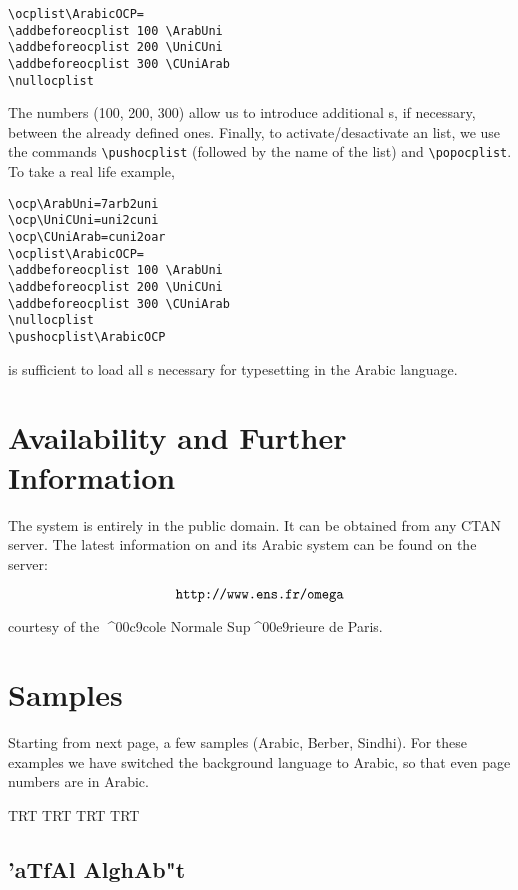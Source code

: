\documentclass[a4paper,11pt]{article}
\begin{document}
\begin{verbatim}
\ocplist\ArabicOCP=
\addbeforeocplist 100 \ArabUni
\addbeforeocplist 200 \UniCUni
\addbeforeocplist 300 \CUniArab
\nullocplist
\end{verbatim}

The numbers (100, 200, 300) allow us to introduce additional \OTP{}s,
if necessary, between the already defined ones.  Finally, to
activate/desactivate an \OTP{} list, we use the commands
\verb=\pushocplist= (followed by the name of the \OTP{} list) and
\verb=\popocplist=. To take a real life example,

\begin{verbatim}
\ocp\ArabUni=7arb2uni
\ocp\UniCUni=uni2cuni
\ocp\CUniArab=cuni2oar
\ocplist\ArabicOCP=
\addbeforeocplist 100 \ArabUni
\addbeforeocplist 200 \UniCUni
\addbeforeocplist 300 \CUniArab
\nullocplist
\pushocplist\ArabicOCP
\end{verbatim}

\noindent is sufficient to load all \OTP{}s necessary for typesetting
in the Arabic language.

\section{Availability and Further Information}

The \OMEGA{} system is entirely in the public domain. It can be
obtained from any CTAN server. The latest information on \OMEGA{} and
its Arabic system can be found on the \OMEGA{} server:

$$\text{\texttt{http://www.ens.fr/omega}}$$

\noindent courtesy of the ^^^^00c9cole Normale Sup^^^^00e9rieure de
Paris.

\section{Samples}

Starting from next page, a few samples (Arabic, Berber, Sindhi). For
these examples we have switched the background language to Arabic, so
that even page numbers are in Arabic.

\newpage
\pagedir TRT
\bodydir TRT
\pardir TRT
\textdir TRT
\def\latinit#1{{\fontfamily{omlgc}\selectfont\pushocplist\BasicLatinOCP%
\textdir TLT #1\popocplist}}
\def\rmdefault{omarb}
\selectfont
\pushocplist\ArabicOCP


\subsection{'aTfAl AlghAb"t}
\end{document}
